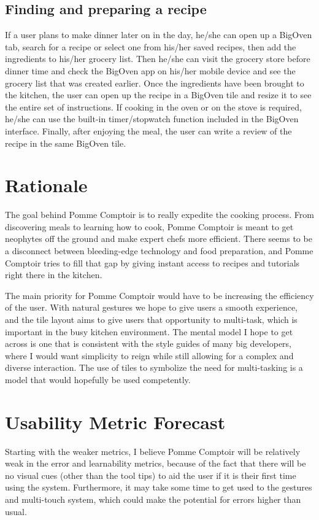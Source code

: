 \documentclass[fleqn,10pt]{wlpeerj}
\begin{document}
\subsection*{Finding and preparing a recipe}
If a user plans to make dinner later on in the day, he/she can open up a BigOven tab, search for a recipe or select one from his/her saved recipes, then add the ingredients to his/her grocery list. Then he/she can visit the grocery store before dinner time and check the BigOven app on his/her mobile device and see the grocery list that was created earlier. Once the ingredients have been brought to the kitchen, the user can open up the recipe in a BigOven tile and resize it to see the entire set of instructions. If cooking in the oven or on the stove is required, he/she can use the built-in timer/stopwatch function included in the BigOven interface. Finally, after enjoying the meal, the user can write a review of the recipe in the same BigOven tile.

\section*{Rationale}
The goal behind Pomme Comptoir is to really expedite the cooking process. From discovering meals to learning how to cook, Pomme Comptoir is meant to get neophytes off the ground and make expert chefs more efficient. There seems to be a disconnect between bleeding-edge technology and food preparation, and Pomme Comptoir tries to fill that gap by giving instant access to recipes and tutorials right there in the kitchen.

The main priority for Pomme Comptoir would have to be increasing the efficiency of the user. With natural gestures we hope to give users a smooth experience, and the tile layout aims to give users that opportunity to multi-task, which is important in the busy kitchen environment. The mental model I hope to get across is one that is consistent with the style guides of many big developers, where I would want simplicity to reign while still allowing for a complex and diverse interaction. The use of tiles to symbolize the need for multi-tasking is a model that would hopefully be used competently. 

\section*{Usability Metric Forecast}
Starting with the weaker metrics, I believe Pomme Comptoir will be relatively weak in the error and learnability metrics, because of the fact that there will be no visual cues (other than the tool tips) to aid the user if it is their first time using the system. Furthermore, it may take some time to get used to the gestures and multi-touch system, which could make the potential for errors higher than usual.
\end{document}
